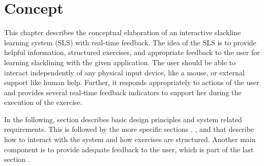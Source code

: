 \chapter{Concept}\label{4_concept}
This chapter describes the conceptual elaboration of an interactive slackline learning system (SLS) with real-time feedback.
The idea of the SLS is to provide helpful information, structured exercises, and appropriate feedback to the user for learning slacklining with the given application. 
The user should be able to interact independently of any physical input device, like a mouse, or external support like human help.
Further, it responds appropriately to actions of the user and provides several real-time feedback indicators to support her during the execution of the exercise.

In the following, section \textit{} describes basic design principles and system related requirements. This is followed by the more specific sections \textit{}, \textit{}, and \textit{} that describe how to interact with the system and how exercises are structured. Another main component is to provide adequate feedback to the user, which is part of the last section \textit{}. %






